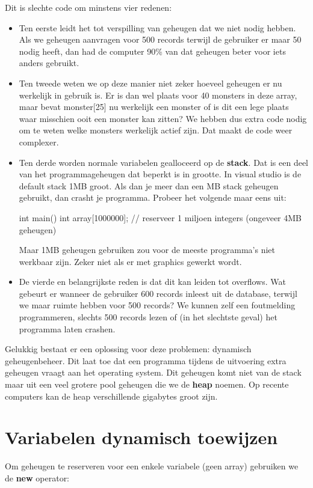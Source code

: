\documentclass[11pt, oldfontcommands, oneside, a4paper]{memoir}
\begin{document}
Dit is slechte code om minstens vier redenen:

\begin{itemize}
	\item Ten eerste leidt het tot verspilling van geheugen dat we niet nodig hebben. Als we geheugen aanvragen voor 500 records terwijl de gebruiker er maar 50 nodig heeft, dan had de computer 90\% van dat geheugen beter voor iets anders gebruikt.
	\item Ten tweede weten we op deze manier niet zeker hoeveel geheugen er nu werkelijk in gebruik is. Er is dan wel plaats voor 40 monsters in deze array, maar bevat monster[25] nu werkelijk een monster of is dit een lege plaats waar misschien ooit een monster kan zitten? We hebben dus extra code nodig om te weten welke monsters werkelijk actief zijn. Dat maakt de code weer complexer.
	\item Ten derde worden normale variabelen gealloceerd op de \textbf{stack}. Dat is een deel van het programmageheugen dat beperkt is in grootte. In visual studio is de default stack 1MB groot. Als dan je meer dan een MB stack geheugen gebruikt, dan crasht je programma. Probeer het volgende maar eens uit:

\begin{code}
int main() {
	int array[1000000]; // reserveer 1 miljoen integers (ongeveer 4MB geheugen)
}
\end{code}

	Maar 1MB geheugen gebruiken zou voor de meeste programma's niet werkbaar zijn. Zeker niet als er met graphics gewerkt wordt.

	\item De vierde en belangrijkste reden is dat dit kan leiden tot overflows. Wat gebeurt er wanneer de gebruiker 600 records inleest uit de database, terwijl we maar ruimte hebben voor 500 records? We kunnen zelf een foutmelding programmeren, slechts 500 records lezen of (in het slechtste geval) het programma laten crashen.
\end{itemize}

Gelukkig bestaat er een oplossing voor deze problemen: dynamisch geheugenbeheer. Dit laat toe dat een programma tijdens de uitvoering extra geheugen vraagt aan het operating system. Dit geheugen komt niet van de stack maar uit een veel grotere pool geheugen die we de \textbf{heap} noemen. Op recente computers kan de heap verschillende gigabytes groot zijn.

\section{Variabelen dynamisch toewijzen}
Om geheugen te reserveren voor een enkele variabele (geen array) gebruiken we de \textbf{new} operator:
\end{document}
